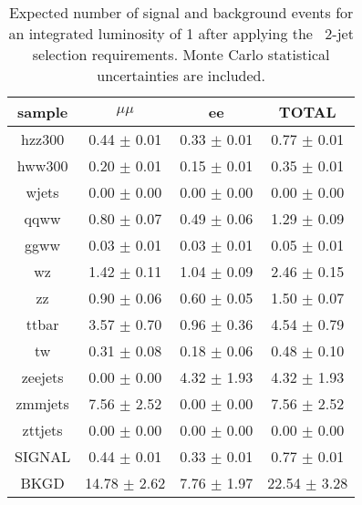 \begin{table}[!ht]
\begin{center}
\begin{tabular}{c|c|c|c}
\hline
sample    & $\mu\mu$    & ee     & TOTAL\\ \hline 
hzz300   & 0.44 $\pm$ 0.01   & 0.33 $\pm$ 0.01   & 0.77 $\pm$ 0.01 \\ \hline 
hww300   & 0.20 $\pm$ 0.01   & 0.15 $\pm$ 0.01   & 0.35 $\pm$ 0.01 \\ \hline 
wjets   & 0.00 $\pm$ 0.00   & 0.00 $\pm$ 0.00   & 0.00 $\pm$ 0.00 \\ \hline 
qqww   & 0.80 $\pm$ 0.07   & 0.49 $\pm$ 0.06   & 1.29 $\pm$ 0.09 \\ \hline 
ggww   & 0.03 $\pm$ 0.01   & 0.03 $\pm$ 0.01   & 0.05 $\pm$ 0.01 \\ \hline 
wz   & 1.42 $\pm$ 0.11   & 1.04 $\pm$ 0.09   & 2.46 $\pm$ 0.15 \\ \hline 
zz   & 0.90 $\pm$ 0.06   & 0.60 $\pm$ 0.05   & 1.50 $\pm$ 0.07 \\ \hline 
ttbar   & 3.57 $\pm$ 0.70   & 0.96 $\pm$ 0.36   & 4.54 $\pm$ 0.79 \\ \hline 
tw   & 0.31 $\pm$ 0.08   & 0.18 $\pm$ 0.06   & 0.48 $\pm$ 0.10 \\ \hline 
zeejets   & 0.00 $\pm$ 0.00   & 4.32 $\pm$ 1.93   & 4.32 $\pm$ 1.93 \\ \hline 
zmmjets   & 7.56 $\pm$ 2.52   & 0.00 $\pm$ 0.00   & 7.56 $\pm$ 2.52 \\ \hline 
zttjets   & 0.00 $\pm$ 0.00   & 0.00 $\pm$ 0.00   & 0.00 $\pm$ 0.00 \\ \hline 
SIGNAL   & 0.44 $\pm$ 0.01   & 0.33 $\pm$ 0.01   & 0.77 $\pm$ 0.01 \\ \hline 
BKGD   & 14.78 $\pm$ 2.62   & 7.76 $\pm$ 1.97   & 22.54 $\pm$ 3.28 \\ \hline 
\end{tabular}
\caption{\fixme{}Expected number of signal and background events for an 
  integrated luminosity of 1\ifb{} after applying the \ww\ 
  2-jet selection requirements. Monte Carlo statistical 
  uncertainties are included.}
\label{tab:mcyield_zzsel_2j}
\end{center}
\end{table}
